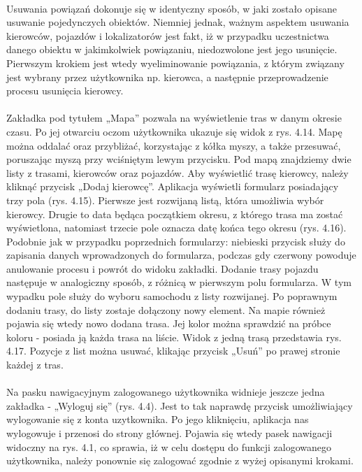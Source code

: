 \paragraph{}
Usuwania powiązań dokonuje się w identyczny sposób, w jaki zostało opisane usuwanie pojedynczych obiektów. Niemniej jednak, ważnym aspektem usuwania kierowców, pojazdów i lokalizatorów jest fakt, iż w przypadku uczestnictwa danego obiektu w jakimkolwiek powiązaniu, niedozwolone jest jego usunięcie. Pierwszym krokiem jest wtedy wyeliminowanie powiązania, z którym związany jest wybrany przez użytkownika np. kierowca, a następnie przeprowadzenie procesu usunięcia kierowcy.

\paragraph{}
Zakładka pod tytułem „Mapa” pozwala na wyświetlenie tras w danym okresie czasu. Po jej otwarciu oczom użytkownika ukazuje się widok z rys. 4.14. Mapę można oddalać oraz przybliżać, korzystając z kółka myszy, a także przesuwać, poruszając myszą przy wciśniętym lewym przycisku. Pod mapą znajdziemy dwie listy z trasami, kierowców oraz pojazdów. Aby wyświetlić trasę kierowcy, należy kliknąć przycisk „Dodaj kierowcę”. Aplikacja wyświetli formularz posiadający trzy pola (rys. 4.15). Pierwsze jest rozwijaną listą, która umożliwia wybór kierowcy. Drugie to data będąca początkiem okresu, z którego trasa ma zostać wyświetlona, natomiast trzecie pole oznacza datę końca tego okresu (rys. 4.16). Podobnie jak w przypadku poprzednich formularzy: niebieski przycisk służy do zapisania danych wprowadzonych do formularza, podczas gdy czerwony powoduje anulowanie procesu i powrót do widoku zakładki. Dodanie trasy pojazdu następuje w analogiczny sposób, z różnicą w pierwszym polu formularza. W tym wypadku pole służy do wyboru samochodu z listy rozwijanej. Po poprawnym dodaniu trasy, do listy zostaje dołączony nowy element. Na mapie również pojawia się wtedy nowo dodana trasa. Jej kolor można sprawdzić na próbce koloru - posiada ją każda trasa na liście. Widok z jedną trasą przedstawia rys. 4.17. Pozycje z list można usuwać, klikając przycisk „Usuń” po prawej stronie każdej z tras.

\paragraph{}
Na pasku nawigacyjnym zalogowanego użytkownika widnieje jeszcze jedna zakładka - „Wyloguj się” (rys. 4.4). Jest to tak naprawdę przycisk umożliwiający wylogowanie się z konta uzytkownika. Po jego kliknięciu, aplikacja nas wylogowuje i przenosi do strony głównej. Pojawia się wtedy pasek nawigacji widoczny na rys. 4.1, co sprawia, iż w celu dostępu do funkcji zalogowanego użytkownika, należy ponownie się zalogować zgodnie z wyżej opisanymi krokami.

